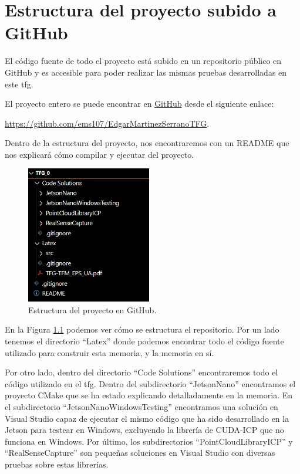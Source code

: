 \chapter{Estructura del proyecto subido a GitHub}

El código fuente de todo el proyecto está subido en un repositorio público en GitHub y es accesible para poder realizar las mismas pruebas desarrolladas en este \gls{tfg}.

El proyecto entero se puede encontrar en \href{https://github.com/ems107/EdgarMartinezSerranoTFG}{GitHub} desde el siguiente enlace:

\href{https://github.com/ems107/EdgarMartinezSerranoTFG}{https://github.com/ems107/EdgarMartinezSerranoTFG}.

Dentro de la estructura del proyecto, nos encontraremos con un README que nos explicará cómo compilar y ejecutar del proyecto.

\begin{figure}[h]
    \centering
    \includegraphics[height=6cm]{archivos/estructura-proyecto.png}
    \caption{Estructura del proyecto en GitHub.}
    \label{fig:estructura-proyecto}
\end{figure}

En la Figura \ref{fig:estructura-proyecto} podemos ver cómo se estructura el repositorio.
Por un lado tenemos el directorio ``Latex'' donde podemos encontrar todo el código fuente utilizado para construir esta memoria, y la memoria en sí.

Por otro lado, dentro del directorio ``Code Solutions'' encontraremos todo el código utilizado en el \gls{tfg}.
Dentro del subdirectorio ``JetsonNano'' encontramos el proyecto CMake que se ha estado explicando detalladamente en la memoria.
En el subdirectorio ``JetsonNanoWindowsTesting'' encontramos una solución en Visual Studio capaz de ejecutar el mismo código que ha sido desarrollado en la Jetson para testear en Windows, excluyendo la librería de CUDA-ICP que no funciona en Windows.
Por último, los subdirectorios ``PointCloudLibraryICP'' y ``RealSenseCapture'' son pequeñas soluciones en Visual Studio con diversas pruebas sobre estas librerías.